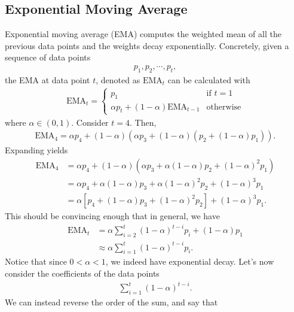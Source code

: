\documentclass[letterpaper, 11pt]{article}
\newcommand{\1}{\mathds{1}}		%
\theoremstyle{definition}
\begin{document}
    \subsection{Exponential Moving Average}
    \bigbreak \noindent 
    Exponential moving average (EMA) computes the weighted mean of all the previous data points and the weights decay exponentially. Concretely, given a sequence of data points
    \begin{align*}
        p_{1}, p_{2}, \cdots, p_{t}
    ,\end{align*}
    the EMA at data point $t$, denoted as $\text{EMA}_{t}$ can be calculated with
    \begin{align*}
        \text{EMA}_{t} = \begin{cases}
            p_{1} &\text{if } t = 1 \\
            \alpha p_{t} + (1-\alpha)\text{EMA}_{t-1} & \text{otherwise}
        \end{cases}
    \end{align*}
    where $\alpha \in (0,1)$. Consider $t = 4$. Then,
    \begin{align*}
        \text{EMA}_{4} = \alpha p_{4} + (1-\alpha)\left(\alpha p_{3} + (1-\alpha) \left(p_{2} + (1-\alpha)p_{1}\right)\right)
    .\end{align*}
    Expanding yields
    \begin{align*}
        \text{EMA}_{4} &= \alpha p_{4} + (1-\alpha)\left(\alpha p_{3} + \alpha ( 1-\alpha)p_{2} + (1-\alpha)^{2} p_{1}\right) \\
                       &= \alpha p_{4} + \alpha (1-\alpha)p_{3} + \alpha (1-\alpha)^{2}p_{2} + (1-\alpha)^{3}p_{1} \\
                       &= \alpha\left[p_{4} + (1-\alpha)p_{3} + (1-\alpha)^{2}p_{2}\right] + (1-\alpha)^{3}p_{1}
    .\end{align*}
    This should be convincing enough that in general, we have
    \begin{align*}
        \text{EMA}_{t} &= \alpha\sum_{i=2}^{t}(1-\alpha)^{t-i}p_{i} + (1-\alpha)p_{1} \\
         &\approx \alpha \sum_{i=1}^{t}(1-\alpha)^{t-i}p_{i}
    .\end{align*}
    Notice that since $ 0 < \alpha < 1$, we indeed have exponential decay. Let's now consider the coefficients of the data points
    \begin{align*}
        \sum_{i=1}^{t}(1-\alpha)^{t-i}
    .\end{align*}
    We can instead reverse the order of the sum, and say that
\end{document}
